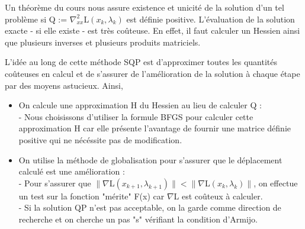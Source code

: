\par 
Un théorème du cours nous assure existence et unicité de la solution d'un tel problème si Q := $\nabla_{xx}^2 $L$(x_k,\lambda_k)$ est définie positive.
L'évaluation de la solution exacte - si elle existe - est très coûteuse. En effet, il faut calculer un Hessien ainsi que plusieurs inverses et plusieurs produits matriciels. \\
\par 
L'idée au long de cette méthode SQP est d'approximer toutes les quantités coûteuses en calcul et de s'assurer de l'amélioration de la solution à chaque étape par des moyens astucieux.\medbreak
Ainsi,\\
\renewcommand{\labelitemi}{\textbullet}
\begin{itemize}
\item On calcule une approximation H du Hessien au lieu de calculer Q : \\
- Nous choisissons d'utiliser la formule BFGS pour calculer cette approximation H car elle présente l'avantage de fournir 
une matrice définie positive qui ne nécéssite pas de modification.\\
\item On utilise la méthode de globalisation pour s'assurer que le déplacement calculé est une amélioration :\\
\indent- Pour s'assurer que $\|    \nabla $L$(x_{k+1},\lambda_{k+1})   \| < \|    \nabla $L$(x_{k},\lambda_{k})   \|$,
on effectue un test sur la fonction "mérite" F(x) car $\nabla $L est coûteux à calculer. \\
\indent- Si la solution QP n'est pas acceptable, on la garde comme direction de recherche et on cherche un pas "s" vérifiant la condition d'Armijo.\\
\end{itemize}
\par

